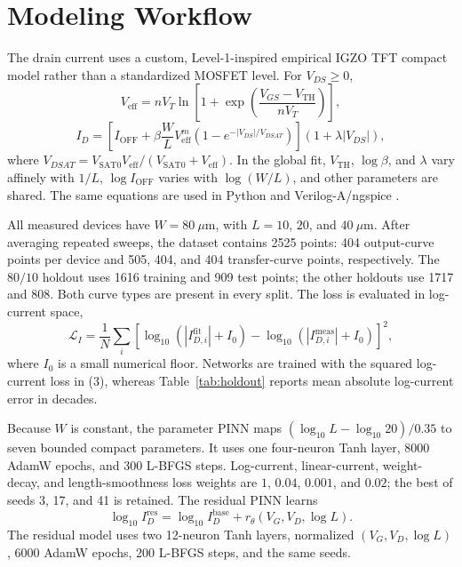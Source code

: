 \documentclass[conference,letterpaper,10pt]{IEEEtran}
\begin{document}
\section{Modeling Workflow}
The drain current uses a custom, Level-1-inspired empirical IGZO TFT compact model rather than a standardized MOSFET level. For \(V_{DS}\geq0\),
\begin{equation}
 V_{\mathrm{eff}}=nV_T\ln\!\left[1+\exp\!\left(\frac{V_{GS}-V_{\mathrm{TH}}}{nV_T}\right)\right],
\end{equation}
\begin{equation}
 I_D=\left[I_{\mathrm{OFF}}+\beta\frac{W}{L}V_{\mathrm{eff}}^m
 \left(1-e^{-|V_{DS}|/V_{DSAT}}\right)\right]
 \left(1+\lambda|V_{DS}|\right),
\end{equation}
where \(V_{DSAT}=V_{\mathrm{SAT0}}V_{\mathrm{eff}}/(V_{\mathrm{SAT0}}+V_{\mathrm{eff}})\). In the global fit, \(V_{\mathrm{TH}}\), \(\log\beta\), and \(\lambda\) vary affinely with \(1/L\), \(\log I_{\mathrm{OFF}}\) varies with \(\log(W/L)\), and other parameters are shared. The same equations are used in Python and Verilog-A/ngspice \cite{ngspice_manual}.

All measured devices have \(W=80~\mu\mathrm{m}\), with \(L=10\), \(20\), and \(40~\mu\mathrm{m}\). After averaging repeated sweeps, the dataset contains 2525 points: 404 output-curve points per device and 505, 404, and 404 transfer-curve points, respectively. The \(80/10\) holdout uses 1616 training and 909 test points; the other holdouts use 1717 and 808. Both curve types are present in every split. The loss is evaluated in log-current space,
\begin{equation}
    \mathcal{L}_{I} = \frac{1}{N}\sum_i
    \left[\log_{10}(|I_{D,i}^{\mathrm{fit}}|+I_0)
    - \log_{10}(|I_{D,i}^{\mathrm{meas}}|+I_0)\right]^2,
\end{equation}
where \(I_0\) is a small numerical floor.
Networks are trained with the squared log-current loss in (3), whereas Table~\ref{tab:holdout} reports mean absolute log-current error in decades.

Because \(W\) is constant, the parameter PINN maps \((\log_{10}L-\log_{10}20)/0.35\) to seven bounded compact parameters. It uses one four-neuron Tanh layer, 8000 AdamW epochs, and 300 L-BFGS steps. Log-current, linear-current, weight-decay, and length-smoothness loss weights are \(1\), \(0.04\), \(0.001\), and \(0.02\); the best of seeds 3, 17, and 41 is retained. The residual PINN learns
\begin{equation}
    \log_{10} I_D^{\mathrm{res}} =
    \log_{10} I_D^{\mathrm{base}} +
    r_{\theta}(V_G,V_D,\log L).
\end{equation}
The residual model uses two 12-neuron Tanh layers, normalized \((V_G,V_D,\log L)\), 6000 AdamW epochs, 200 L-BFGS steps, and the same seeds.
\end{document}
